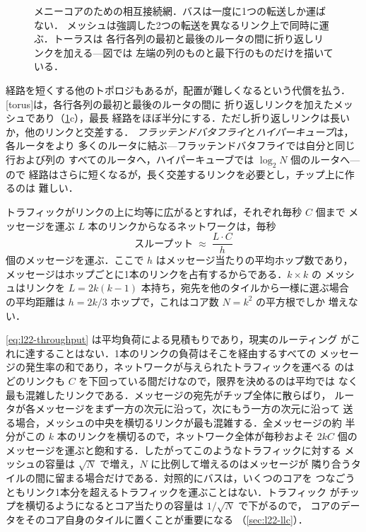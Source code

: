 \documentclass[../main.tex]{subfiles}
\begin{document}
\begin{figure}[htbp]
  \centering
  
  \caption{メニーコアのための相互接続網．バスは一度に1つの転送しか運ばない．
    メッシュは強調した2つの転送を異なるリンク上で同時に運ぶ．トーラスは
    各行各列の最初と最後のルータの間に折り返しリンクを加える---図では
    左端の列のものと最下行のものだけを描いている．}
  \label{fig:l22-topologies}
\end{figure}

経路を短くする他のトポロジもあるが，配置が難しくなるという代償を払う．
[torus]は，各行各列の最初と最後のルータの間に
折り返しリンクを加えたメッシュであり（\cref{fig:l22-topologies}c），最長
経路をほぼ半分にする．ただし折り返しリンクは長いか，他のリンクと交差する．
\emph{フラッテンドバタフライ}と\emph{ハイパーキューブ}は，各ルータをより
多くのルータに結ぶ---フラッテンドバタフライでは自分と同じ行および列の
すべてのルータへ，ハイパーキューブでは $\log_{2}N$ 個のルータへ---ので
経路はさらに短くなるが，長く交差するリンクを必要とし，チップ上に作るのは
難しい．

トラフィックがリンクの上に均等に広がるとすれば，それぞれ毎秒 $C$ 個まで
メッセージを運ぶ $L$ 本のリンクからなるネットワークは，毎秒
\begin{equation}
  \text{スループット} \;\approx\; \frac{L\cdot C}{h}
  \label{eq:l22-throughput}
\end{equation}
個のメッセージを運ぶ．ここで $h$ はメッセージ当たりの平均ホップ数であり，
メッセージはホップごとに1本のリンクを占有するからである．$k\times k$ の
メッシュはリンクを $L=2k(k-1)$ 本持ち，宛先を他のタイルから一様に選ぶ場合
の平均距離は $h=2k/3$ ホップで，これはコア数 $N=k^{2}$ の平方根でしか
増えない．

\cref{eq:l22-throughput} は平均負荷による見積もりであり，現実のルーティング
がこれに達することはない．1本のリンクの負荷はそこを経由するすべての
メッセージの発生率の和であり，ネットワークが与えられたトラフィックを運べる
のはどのリンクも $C$ を下回っている間だけなので，限界を決めるのは平均では
なく最も混雑したリンクである．メッセージの宛先がチップ全体に散らばり，
ルータが各メッセージをまず一方の次元に沿って，次にもう一方の次元に沿って
送る場合，メッシュの中央を横切るリンクが最も混雑する．全メッセージの約
半分がこの $k$ 本のリンクを横切るので，ネットワーク全体が毎秒およそ
$2kC$ 個のメッセージを運ぶと飽和する．したがってこのようなトラフィックに対する
メッシュの容量は $\sqrt{N}$ で増え，$N$ に比例して増えるのはメッセージが
隣り合うタイルの間に留まる場合だけである．対照的にバスは，いくつのコアを
つなごうともリンク1本分を超えるトラフィックを運ぶことはない．トラフィック
がチップを横切るようになるとコア当たりの容量は $1/\sqrt{N}$ で下がるので，
コアのデータをそのコア自身のタイルに置くことが重要になる
（\cref{sec:l22-llc}）．
\end{document}

